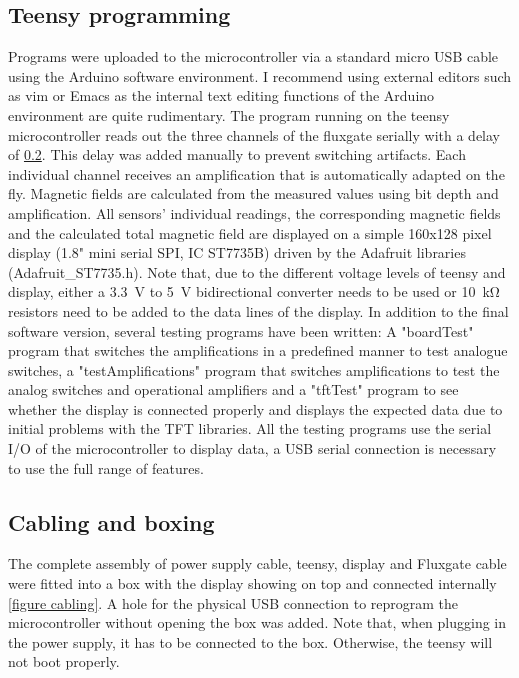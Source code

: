         \subsection{Teensy programming}
        Programs were uploaded to the microcontroller via a standard micro USB cable using the Arduino software environment. I recommend using external editors such as vim or Emacs as the internal text editing functions of the Arduino environment are quite rudimentary. The program running on the teensy microcontroller reads out the three channels of the fluxgate serially with a delay of \ref{}. This delay was added manually to prevent switching artifacts. Each individual channel receives an amplification that is automatically adapted on the fly. Magnetic fields are calculated from the measured values using bit depth and amplification. All sensors' individual readings, the corresponding magnetic fields and the calculated total magnetic field are displayed on a simple 160x128 pixel display (1.8" mini serial SPI, IC ST7735B) driven by the Adafruit libraries (Adafruit\_ST7735.h). Note that, due to the different voltage levels of teensy and display, either a \SI{3.3}{\volt} to \SI{5}{\volt} bidirectional converter needs to be used or \SI{10}{\kilo\ohm} resistors need to be added to the data lines of the display. In addition to the final software version, several testing programs have been written: A "boardTest" program that switches the amplifications in a predefined manner to test analogue switches, a "testAmplifications" program that switches amplifications to test the analog switches and operational amplifiers and a "tftTest" program to see whether the display is connected properly and displays the expected data due to initial problems with the TFT libraries. All the testing programs use the serial I/O of the microcontroller to display data, a USB serial connection is necessary to use the full range of features.
        \subsection{Cabling and boxing}
        The complete assembly of power supply cable, teensy, display and Fluxgate cable were fitted into a box with the display showing on top and connected internally \ref{figure cabling}. A hole for the physical USB connection to reprogram the microcontroller without opening the box was added. Note that, when plugging in the power supply, it has to be connected to the box. Otherwise, the teensy will not boot properly.
%
